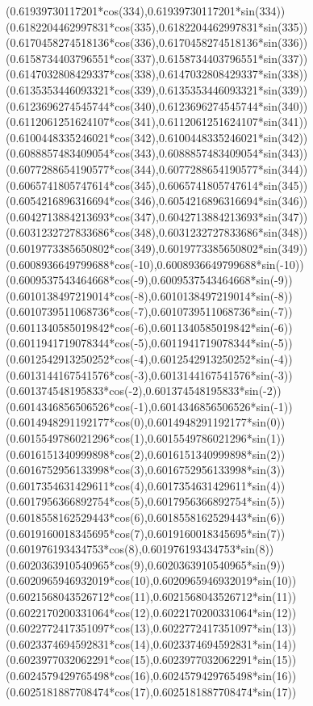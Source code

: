 {({0.61939730117201*cos(334)},{0.61939730117201*sin(334)})
({0.6182204462997831*cos(335)},{0.6182204462997831*sin(335)})
({0.6170458274518136*cos(336)},{0.6170458274518136*sin(336)})
({0.6158734403796551*cos(337)},{0.6158734403796551*sin(337)})
({0.6147032808429337*cos(338)},{0.6147032808429337*sin(338)})
({0.6135353446093321*cos(339)},{0.6135353446093321*sin(339)})
({0.6123696274545744*cos(340)},{0.6123696274545744*sin(340)})
({0.6112061251624107*cos(341)},{0.6112061251624107*sin(341)})
({0.6100448335246021*cos(342)},{0.6100448335246021*sin(342)})
({0.6088857483409054*cos(343)},{0.6088857483409054*sin(343)})
({0.6077288654190577*cos(344)},{0.6077288654190577*sin(344)})
({0.6065741805747614*cos(345)},{0.6065741805747614*sin(345)})
({0.6054216896316694*cos(346)},{0.6054216896316694*sin(346)})
({0.6042713884213693*cos(347)},{0.6042713884213693*sin(347)})
({0.6031232727833686*cos(348)},{0.6031232727833686*sin(348)})
({0.6019773385650802*cos(349)},{0.6019773385650802*sin(349)})
({0.6008936649799688*cos(-10)},{0.6008936649799688*sin(-10)})
({0.6009537543464668*cos(-9)},{0.6009537543464668*sin(-9)})
({0.6010138497219014*cos(-8)},{0.6010138497219014*sin(-8)})
({0.6010739511068736*cos(-7)},{0.6010739511068736*sin(-7)})
({0.6011340585019842*cos(-6)},{0.6011340585019842*sin(-6)})
({0.6011941719078344*cos(-5)},{0.6011941719078344*sin(-5)})
({0.6012542913250252*cos(-4)},{0.6012542913250252*sin(-4)})
({0.6013144167541576*cos(-3)},{0.6013144167541576*sin(-3)})
({0.601374548195833*cos(-2)},{0.601374548195833*sin(-2)})
({0.6014346856506526*cos(-1)},{0.6014346856506526*sin(-1)})
({0.6014948291192177*cos(0)},{0.6014948291192177*sin(0)})
({0.6015549786021296*cos(1)},{0.6015549786021296*sin(1)})
({0.6016151340999898*cos(2)},{0.6016151340999898*sin(2)})
({0.6016752956133998*cos(3)},{0.6016752956133998*sin(3)})
({0.6017354631429611*cos(4)},{0.6017354631429611*sin(4)})
({0.6017956366892754*cos(5)},{0.6017956366892754*sin(5)})
({0.6018558162529443*cos(6)},{0.6018558162529443*sin(6)})
({0.6019160018345695*cos(7)},{0.6019160018345695*sin(7)})
({0.601976193434753*cos(8)},{0.601976193434753*sin(8)})
({0.6020363910540965*cos(9)},{0.6020363910540965*sin(9)})
({0.6020965946932019*cos(10)},{0.6020965946932019*sin(10)})
({0.6021568043526712*cos(11)},{0.6021568043526712*sin(11)})
({0.6022170200331064*cos(12)},{0.6022170200331064*sin(12)})
({0.6022772417351097*cos(13)},{0.6022772417351097*sin(13)})
({0.6023374694592831*cos(14)},{0.6023374694592831*sin(14)})
({0.6023977032062291*cos(15)},{0.6023977032062291*sin(15)})
({0.6024579429765498*cos(16)},{0.6024579429765498*sin(16)})
({0.6025181887708474*cos(17)},{0.6025181887708474*sin(17)})
}
